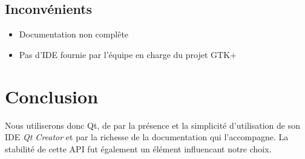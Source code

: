 \documentclass[a4paper]{report}
\begin{document}
\subsection{Inconvénients}
\begin{itemize}
    \item Documentation non complête
    \item Pas d'IDE fournie par l'équipe en charge du projet GTK+
\end{itemize}
\section{Conclusion}
Nous utiliserons donc Qt, de par la présence et la simplicité d'utilisation de son IDE \textit{Qt Creator} et par la richesse de la documentation qui l'accompagne. La stabilité de cette API fut également un élément influencant notre choix.


\printindex
\listoffigures
\end{document}
